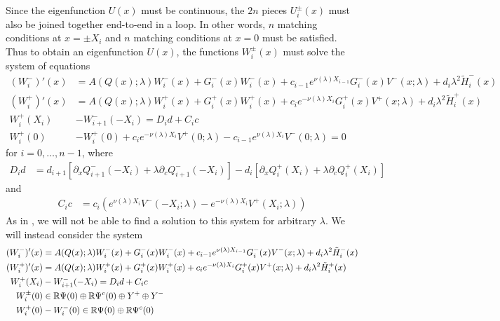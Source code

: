 \documentclass[thesis.tex]{subfiles}
\begin{document}
Since the eigenfunction $U(x)$ must be continuous, the $2n$ pieces $U_i^\pm(x)$ must also be joined together end-to-end in a loop. In other words, $n$ matching conditions at $x = \pm X_i$ and $n$ matching conditions at $x = 0$ must be satisfied. Thus to obtain an eigenfunction $U(x)$, the functions $W_i^\pm(x)$ must solve the system of equations
\begin{equation}\label{eigsystem0}
\begin{aligned}
(W_i^-)'(x) &= A(Q(x); \lambda) W_i^-(x) + G_i^-(x) W_i^-(x) + c_{i-1} e^{\nu(\lambda)X_{i-1}} G_i^-(x)V^-(x; \lambda) + d_i \lambda^2 \tilde{H}_i^-(x) \\
(W_i^+)'(x) &= A(Q(x); \lambda) W_i^+(x) + G_i^+(x) W_i^+(x) + c_i e^{-\nu(\lambda)X_i } G_i^+(x)V^+(x; \lambda) + d_i \lambda^2 \tilde{H}_i^+(x) \\
W_i^+(X_i) &- W_{i+1}^-(-X_i) = D_i d + C_i c \\
W_i^+(0) &- W_i^+(0) + c_i e^{-\nu(\lambda)X_i}V^+(0; \lambda) - c_{i-1} e^{\nu(\lambda)X_i} V^-(0; \lambda) = 0
\end{aligned}
\end{equation}
for $i = 0, \dots, n-1$, where
\begin{align}\label{defDid}
D_i d &= d_{i+1}[\partial_x Q_{i+1}^-(-X_i) + \lambda \partial_c Q_{i+1}^-(-X_i)]
- d_i [ \partial_x Q_i^+(X_i) + \lambda \partial_c Q_i^+(X_i) ]
\end{align}
and
\begin{align}\label{defCic}
C_i c &= c_i \left( e^{\nu(\lambda) X_i} V^-(-X_i; \lambda) - e^{-\nu(\lambda) X_i} V^+(X_i; \lambda) \right)
\end{align}
As in \cite{Sandstede1998}, we will not be able to find a solution to this system for arbitrary $\lambda$. We will instead consider the system
\begin{equation}\label{eigsystem}
\begin{aligned}
(W_i^-)'(x) &= A(Q(x); \lambda) W_i^-(x) + G_i^-(x) W_i^-(x) + c_{i-1} e^{\nu(\lambda)X_{i-1}} G_i^-(x)V^-(x; \lambda) + d_i \lambda^2 \tilde{H}_i^-(x) \\
(W_i^+)'(x) &= A(Q(x); \lambda) W_i^+(x) + G_i^+(x) W_i^+(x) + c_i e^{-\nu(\lambda)X_i } G_i^+(x)V^+(x; \lambda) + d_i \lambda^2 \tilde{H}_i^+(x) \\
W_i^+(X_i) &- W_{i+1}^-(-X_i) = D_i d + C_i c \\
W_i^\pm(0) &\in \mathbb{R} \Psi(0) \oplus \mathbb{R} \Psi^c(0) \oplus Y^+ \oplus Y^- \\
W_i^+(0) &- W_i^-(0) \in \mathbb{R} \Psi(0) \oplus \mathbb{R} \Psi^c(0) 
\end{aligned}
\end{equation}
\end{document}
